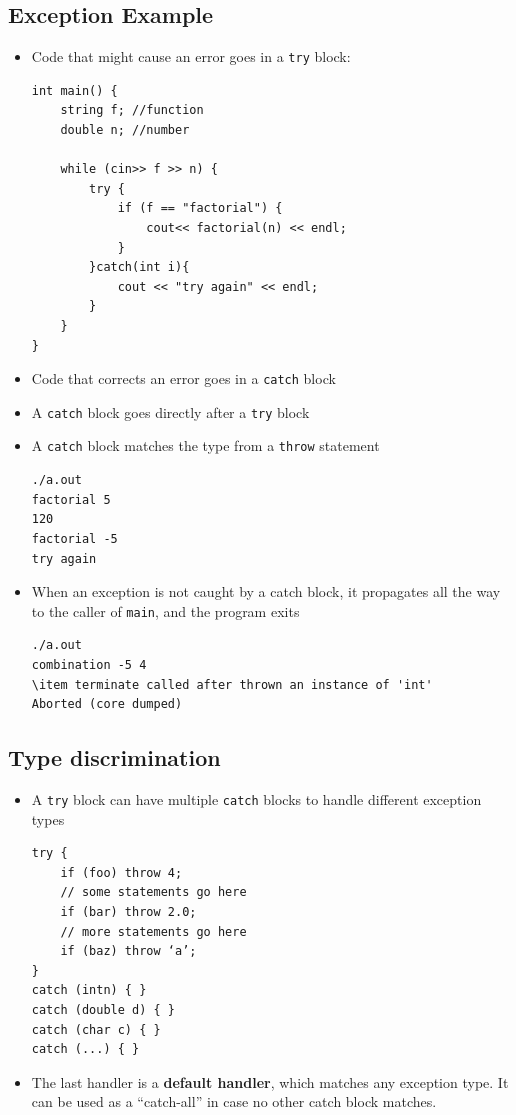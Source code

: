 \subsection{Exception Example}
\begin{itemize}
	\item Code that might cause an error goes in a \lstinline[style=C++]{try} block:
\begin{lstlisting}[style=C++]
int main() {
	string f; //function
	double n; //number
	
	while (cin>> f >> n) {
		try {
			if (f == "factorial") {
				cout<< factorial(n) << endl;
			}
		}catch(int i){
			cout << "try again" << endl;
		}
	}
}
\end{lstlisting}
	\item Code that corrects an error goes in a \lstinline[style=C++]{catch} block
	\item A \lstinline[style=C++]{catch} block goes directly after a \lstinline[style=C++]{try} block
	\item A \lstinline[style=C++]{catch} block matches the type from a \lstinline[style=C++]{throw} statement
\begin{lstlisting}[style=bash]
./a.out
factorial 5
120 
factorial -5
try again
\end{lstlisting}
	\item When an exception is not caught by a catch block, it propagates all the way to the caller of \lstinline[style=C++]{main}, and the program exits
\begin{lstlisting}[style=bash]
./a.out
combination -5 4
\item terminate called after thrown an instance of 'int'
Aborted (core dumped)
\end{lstlisting}
\end{itemize}

\subsection{Type discrimination}
\begin{itemize}
	\item A \lstinline[style=C++]{try} block can have multiple \lstinline[style=C++]{catch} blocks to handle different exception types
\begin{lstlisting}[style=C++]
try {
	if (foo) throw 4;
	// some statements go here
	if (bar) throw 2.0;
	// more statements go here
	if (baz) throw ‘a’;
}
catch (intn) { }
catch (double d) { }
catch (char c) { }
catch (...) { }
\end{lstlisting}
	\item The last handler is a \textbf{default handler}, which matches any exception type. It can be used as a ``catch-all'' in case no other catch block matches.
\end{itemize}


